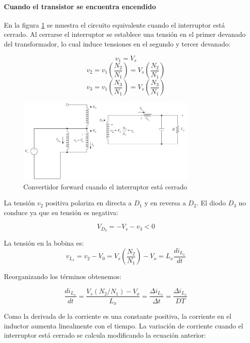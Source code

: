 
\paragraph{Cuando el transistor se encuentra encendido}

En la figura \ref{fig:forward_switch_closed} se muestra el circuito equivalente cuando el interruptor
está cerrado. Al cerrarse el interruptor se establece una tensión en el primer devanado del transformador,
lo cual induce tensiones en el segundo y tercer devanado:

$$ v_1=V_s $$
$$ v_2=v_1\left(\frac{N_2}{N_1}\right)=V_s\left(\frac{N_2}{N_1}\right) $$
$$ v_3=v_1\left(\frac{N_3}{N_1}\right)=V_s\left(\frac{N_3}{N_1}\right) $$

\begin{figure}[ht]
    \centering
    \includegraphics[width=0.8\textwidth]{../images/hart/forward_switch_closed.png}
    \caption{Convertidor forward cuando el interruptor está cerrado}
    \label{fig:forward_switch_closed}
\end{figure}

La tensión $v_2$ positiva polariza en directa a $D_1$ y en reversa a $D_2$. El diodo $D_3$ no conduce ya que su tensión es negativa:

$$ V_{D_3}=-V_s-v_3<0 $$

La tensión en la bobina es:
$$ v_{L_x}=v_2-V_0=V_s\left(\frac{N_2}{N_1}\right)-V_o=L_x\frac{di_{L_x}}{dt} $$

Reorganizando los términos obtenemos:

$$ \frac{di_{L_x}}{dt}=\frac{V_s(N_2/N_1)-V_o}{L_x}=\frac{\Delta i_{L_x}}{\Delta t}=\frac{\Delta i_{L_x}}{DT} $$

Como la derivada de la corriente es una constante positiva, la corriente en el inductor aumenta linealmente con el tiempo. 
La variación de corriente cuando el interruptor está cerrado se calcula modificando la ecuación anterior:

